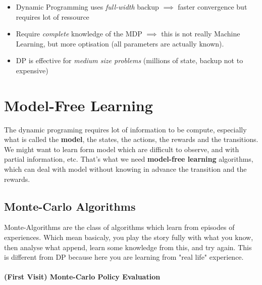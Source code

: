 		\begin{itemize}
			\item Dynamic Programming uses \emph{full-width} backup $\implies$ faster convergence but requires lot of ressource
			\item Require \emph{complete} knowledge of the MDP $\implies$ this is not really Machine Learning, but more optisation (all parameters are actually known).
			\item DP is effective for \emph{medium size problems} (millions of state, backup not to expensive)
		\end{itemize}
	


\section{Model-Free Learning} %
	\label{sec:model_free_learning}

	The dynamic programing requires lot of information to be compute, especially what is called the \textbf{model}, the states, the actions, the rewards and the transitions. We might want to learn form model which are difficult to observe, and with partial information, etc. That's what we need \textbf{model-free learning} algorithms, which can deal with model without knowing in advance the transition and the rewards. 


	\subsection{Monte-Carlo Algorithms} %
		\label{sub:monte_carlo_algorithm}

		Monte-Algorithms are the class of algorithms which learn from episodes of experiences. Which mean basicaly, you play the story fully with what you know, then analyse what append, learn some knowledge from this, and try again. This is different from DP because here you are learning from "real life" experience.

		\paragraph*{(First Visit) Monte-Carlo Policy Evaluation}

